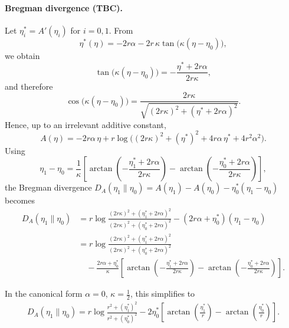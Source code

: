 \documentclass[a4paper,11pt]{article}
\numberwithin{equation}{section}
\theoremstyle{plain}
\theoremstyle{definition}
\theoremstyle{remark}
\newcommand{\1}{\ensuremath{\mathds{1}}\xspace}
\begin{document}
\paragraph{Bregman divergence (TBC).}
Let $\eta_i^\ast=A'(\eta_i)$ for $i=0,1$. From
\[
\eta^\ast(\eta)
=
-2r\alpha-2r\,\kappa\tan\!\big(\kappa(\eta-\eta_0)\big),
\]
we obtain
\[
\tan\!\big(\kappa(\eta-\eta_0)\big)
=
-\frac{\eta^\ast+2r\alpha}{2r\kappa},
\]
and therefore
\[
\cos\!\big(\kappa(\eta-\eta_0)\big)
=
\frac{2r\kappa}{\sqrt{(2r\kappa)^2+(\eta^\ast+2r\alpha)^2}}.
\]
Hence, up to an irrelevant additive constant,
\[
A(\eta)
=
-2r\alpha\,\eta
+r\log\!\Big((2r\kappa)^2+(\eta^\ast)^2+4r\alpha\,\eta^\ast+4r^2\alpha^2\Big).
\]
Using
\[
\eta_1-\eta_0
=
\frac{1}{\kappa}\left[
\arctan\!\left(-\frac{\eta_1^\ast+2r\alpha}{2r\kappa}\right)
-
\arctan\!\left(-\frac{\eta_0^\ast+2r\alpha}{2r\kappa}\right)
\right],
\]
the Bregman divergence
$
D_A(\eta_1\|\eta_0)
=
A(\eta_1)-A(\eta_0)-\eta_0^\ast(\eta_1-\eta_0)
$
becomes
\begin{align}
D_A(\eta_1\|\eta_0)
&=
r\log\frac{(2r\kappa)^2+(\eta_1^\ast+2r\alpha)^2}
{(2r\kappa)^2+(\eta_0^\ast+2r\alpha)^2}
-(2r\alpha+\eta_0^\ast)(\eta_1-\eta_0)
\nonumber\\
&=
r\log\frac{(2r\kappa)^2+(\eta_1^\ast+2r\alpha)^2}
{(2r\kappa)^2+(\eta_0^\ast+2r\alpha)^2}
\nonumber\\
&\quad
-\frac{2r\alpha+\eta_0^\ast}{\kappa}
\left[
\arctan\!\left(-\frac{\eta_1^\ast+2r\alpha}{2r\kappa}\right)
-
\arctan\!\left(-\frac{\eta_0^\ast+2r\alpha}{2r\kappa}\right)
\right].
\end{align}

In the canonical form $\alpha=0$, $\kappa=\tfrac12$, this simplifies to
\begin{align}
D_A(\eta_1\|\eta_0)
=
r\log\frac{r^2+(\eta_1^\ast)^2}{r^2+(\eta_0^\ast)^2}
-2\eta_0^\ast
\left[
\arctan\!\left(\frac{\eta_1^\ast}{r}\right)
-\arctan\!\left(\frac{\eta_0^\ast}{r}\right)
\right].
\end{align}
\end{document}
